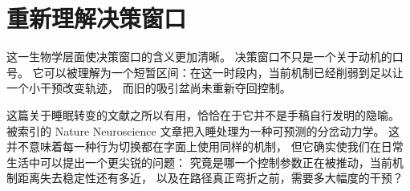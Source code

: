 \section{重新理解决策窗口}

这一生物学层面使决策窗口的含义更加清晰。
决策窗口不只是一个关于动机的口号。
它可以被理解为一个短暂区间：在这一时段内，当前机制已经削弱到足以让一个小干预改变轨迹，
而旧的吸引盆尚未重新夺回控制。

\begin{example}[把入睡视为一种转变模型]
这篇关于睡眠转变的文献之所以有用，恰恰在于它并不是手稿自行发明的隐喻。
被索引的 Nature Neuroscience 文章把入睡处理为一种可预测的分岔动力学。
这并不意味着每一种行为切换都在字面上使用同样的机制，
但它确实使我们在日常生活中可以提出一个更尖锐的问题：
究竟是哪一个控制参数正在被推动，当前机制距离失去稳定性还有多近，
以及在路径真正弯折之前，需要多大幅度的干预？
\end{example}